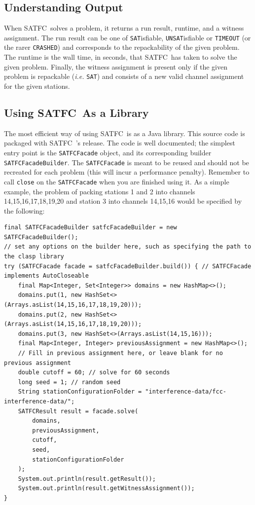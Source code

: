 \documentclass[
10pt, %
letterpaper, %
oneside, %
headinclude,footinclude, %
BCOR5mm, %
needspace, %
]{scrartcl}
\newcommand{\SATFC}{\textsc{SATFC}~}
\begin{document}
\subsection{Understanding Output}
When \SATFC solves a problem, it returns a run result, runtime, and a witness assignment. The run result can be one of \texttt{SAT}isfiable, \texttt{UNSAT}isfiable or \texttt{TIMEOUT} (or the rarer \texttt{CRASHED}) and corresponds to the repackability of the given problem. The runtime is the wall time, in seconds, that \SATFC has taken to solve the given problem. Finally, the witness assignment is present only if the given problem is repackable (\emph{i.e.} \texttt{SAT}) and consists of a new valid channel assignment for the given stations.

\subsection{Using \SATFC As a Library}

The most efficient way of using \SATFC is as a Java library. This source code is packaged with \SATFC's release. The code is well documented; the simplest entry point is the \texttt{SATFCFacade} object, and its corresponding builder \texttt{SATFCFacadeBuilder}. The \texttt{SATFCFacade} is meant to be reused and should not be recreated for each problem (this will incur a performance penalty). Remember to call \texttt{close} on the \texttt{SATFCFacade} when you are finished using it. As a simple example, the problem of packing stations 1 and 2 into channels 14,15,16,17,18,19,20 and station 3 into channels 14,15,16 would be specified by the following:

\begin{verbatim}
final SATFCFacadeBuilder satfcFacadeBuilder = new SATFCFacadeBuilder();
// set any options on the builder here, such as specifying the path to the clasp library
try (SATFCFacade facade = satfcFacadeBuilder.build()) { // SATFCFacade implements AutoCloseable
	final Map<Integer, Set<Integer>> domains = new HashMap<>();
	domains.put(1, new HashSet<>(Arrays.asList(14,15,16,17,18,19,20)));
	domains.put(2, new HashSet<>(Arrays.asList(14,15,16,17,18,19,20)));
	domains.put(3, new HashSet<>(Arrays.asList(14,15,16)));
	final Map<Integer, Integer> previousAssignment = new HashMap<>();
	// Fill in previous assignment here, or leave blank for no previous assignment
	double cutoff = 60; // solve for 60 seconds
	long seed = 1; // random seed
	String stationConfigurationFolder = "interference-data/fcc-interference-data/";
	SATFCResult result = facade.solve(
		domains,
		previousAssignment,
		cutoff,
		seed,
		stationConfigurationFolder
	);
	System.out.println(result.getResult());
	System.out.println(result.getWitnessAssignment());
}
\end{verbatim}
\end{document}
